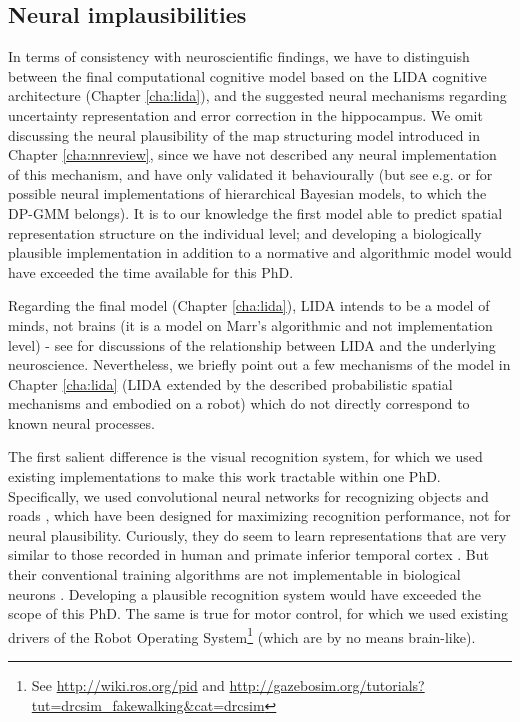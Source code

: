 \subsection{Neural implausibilities}

In terms of consistency with neuroscientific findings, we have to distinguish between the final computational cognitive model based on the LIDA cognitive architecture (Chapter \ref{cha:lida}), and the suggested neural mechanisms regarding uncertainty representation and error correction in the hippocampus. We omit discussing the neural plausibility of the map structuring model introduced in Chapter \ref{cha:nnreview}, since we have not described any neural implementation of this mechanism, and have only validated it behaviourally (but see e.g. \citep{shi2009neural} or \citep{sanborn2015types} for possible neural implementations of hierarchical Bayesian models, to which the DP-GMM belongs). It is to our knowledge the first model able to predict spatial representation structure on the individual level; and developing a biologically plausible implementation in addition to a normative and algorithmic model would have exceeded the time available for this PhD.

Regarding the final model (Chapter \ref{cha:lida}), LIDA intends to be a model of minds, not brains (it is a model on Marr's algorithmic and not implementation level) - see \citep{franklin2012global, franklin2013lida} for discussions of the relationship between LIDA and the underlying neuroscience. Nevertheless, we briefly point out a few mechanisms of the model in Chapter \ref{cha:lida} (LIDA extended by the described probabilistic spatial mechanisms and embodied on a robot) which do not directly correspond to known neural processes. 

The first salient difference is the visual recognition system, for which we used existing implementations to make this work tractable within one PhD. Specifically, we used convolutional neural networks for recognizing objects \citep{szegedy2014going} and roads \citep{brust2015convolutional}, which have been designed for maximizing recognition performance, not for neural plausibility. Curiously, they do seem to learn representations that are very similar to those recorded in human and primate inferior temporal cortex \citep{khaligh2014deep, yamins2013hierarchical}. But their conventional training algorithms are not implementable in biological neurons \citep{stork1989backpropagation, bengio2015towards}. Developing a plausible recognition system would have exceeded the scope of this PhD. The same is true for motor control, for which we used existing drivers of the Robot Operating System\footnote{See \url{http://wiki.ros.org/pid} and \url{http://gazebosim.org/tutorials?tut=drcsim_fakewalking&cat=drcsim}} (which are by no means brain-like).

